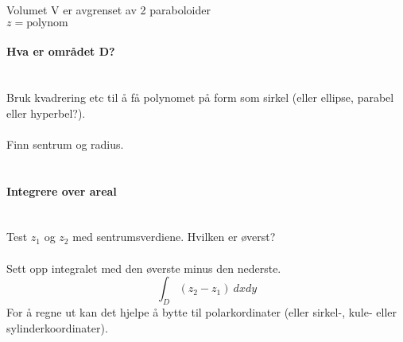 Volumet V er avgrenset av 2 paraboloider\\

$z = \text{polynom}$



\paragraph{Hva er området D?} \mbox{} \\
Bruk kvadrering etc til å få polynomet på form som
sirkel (eller ellipse, parabel eller hyperbel?). \\\\
Finn sentrum og radius.\\\\



\paragraph{Integrere over areal} \mbox{} \\
Test $z_1$ og $z_2$ med sentrumsverdiene. Hvilken er øverst?\\\\
Sett opp integralet med den øverste minus den nederste.
$$\int_D (z_2 - z_1) \: dx dy$$
For å regne ut kan det hjelpe å bytte til polarkordinater
(eller sirkel-, kule- eller sylinderkoordinater).
